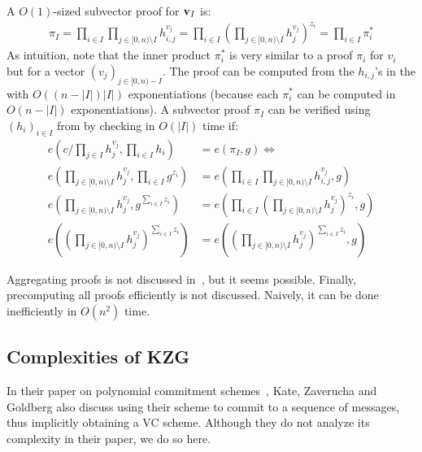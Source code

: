 A $O(1)$-sized subvector proof for $\bm{\mathrm{v}}_I$ is:
\begin{align}
\pi_I = \prod_{i \in I}\prod_{j \in [0,n)\setminus I} h_{i,j}^{v_j}=\prod_{i \in I}\left(\prod_{j \in [0,n)\setminus I} h_{j}^{v_j}\right)^{z_i}=\prod_{i\in I} \pi_i^*
\end{align}
As intuition, note that the inner product $\pi_i^*$ is very similar to a proof $\pi_i$ for $v_i$ but for a vector $(v_j)_{j\in [0,n) - I}$.
The proof can be computed from the $h_{i,j}$'s in the \prk with $O((n-|I|)|I|)$ exponentiations (because each $\pi_i^*$ can be computed in $O(n-|I|)$ exponentiations).
A subvector proof $\pi_I$ can be verified using $(h_i)_{i\in I}$ from \vrk by checking in $O(|I|)$ time if:
\begin{align}
e\left(c/\prod_{j\in I} h_j^{v_j}, \prod_{i\in I} h_i\right) &= e(\pi_I, g)\Leftrightarrow\\
e\left(\prod_{j\in [0,n)\setminus I} h_j^{v_j}, \prod_{i\in I} g^{z_i}\right) &= e\left(\prod_{i \in I}\prod_{j \in [0,n)\setminus I} h_{i,j}^{v_j}, g\right)\\
e\left(\prod_{j\in [0,n)\setminus I} h_j^{v_j}, g^{\sum_{i\in I} z_i}\right) &= e\left(\prod_{i \in I}\left(\prod_{j \in [0,n)\setminus I} h_{j}^{v_j}\right)^{z_i}, g\right)\\
e\left(\left(\prod_{j\in [0,n)\setminus I} h_j^{v_j}\right)^{\sum_{i\in I} z_i}\right) &= e\left(\left(\prod_{j \in [0,n)\setminus I} h_{j}^{v_j}\right)^{\sum_{i \in I}z_i}, g\right)
\end{align}

Aggregating proofs is not discussed in~\cite{CF13,LM19}, but it seems possible.
Finally, precomputing all proofs efficiently is not discussed.
Naively, it can be done inefficiently in $O(n^2)$ time.

\subsection{Complexities of KZG~\cite{KZG10a}}
\label{s:complexity-kzg}
In their paper on polynomial commitment schemes~\cite[Sec ]{KZG10a}, Kate, Zaverucha and Goldberg also discuss using their scheme to commit to a sequence of messages, thus implicitly obtaining a VC scheme.
Although they do not analyze its complexity in their paper, we do so here.

